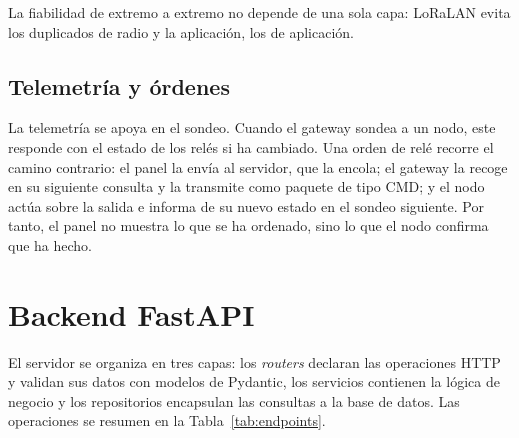La fiabilidad de extremo a extremo no depende de una sola capa: LoRaLAN evita
los duplicados de radio y la aplicación, los de aplicación.

\subsection{Telemetría y órdenes}

La telemetría se apoya en el sondeo. Cuando el gateway sondea a un nodo, este responde con el estado de los relés si ha cambiado. Una orden de relé recorre el camino contrario: el panel la envía al servidor, que la encola; el gateway la recoge en su siguiente consulta y la transmite como paquete de tipo CMD; y el nodo actúa sobre la salida e informa de su nuevo estado en el sondeo siguiente. Por tanto, el panel no muestra lo que se ha ordenado, sino lo que el nodo confirma que ha hecho.

\section{Backend FastAPI}

El servidor se organiza en tres capas: los \textit{routers} declaran las operaciones HTTP y validan sus datos con modelos de Pydantic, los servicios contienen la lógica de negocio y los repositorios encapsulan las consultas a la base de datos. Las operaciones se resumen en la Tabla~\ref{tab:endpoints}.

